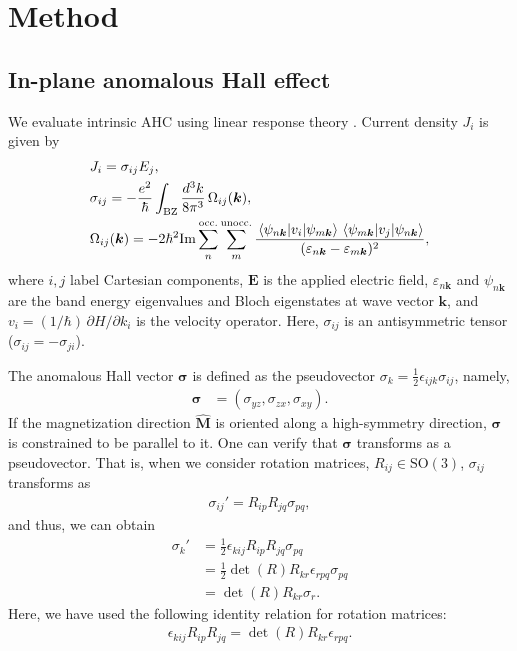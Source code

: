 \documentclass[preprint,12pt]{elsarticle}
\begin{document}
 \section{Method}

\subsection{In-plane anomalous Hall effect}
\label{sec:iahe}

We evaluate intrinsic AHC using linear response theory
\cite{Xiao2010-zr}. Current density $J_i$ is given by
\begin{align}
  & J_i = \sigma_{ij} E_j,
  \\
  & \sigma_{ij} = -\frac{e^2}{\hbar} \int_{\mathrm{BZ}} \frac{d^3 k}{8\pi^3}
  \, \Omega_{ij} (\bm{k}),   \\
  & \Omega_{ij} (\bm{k}) = -2 \hbar^2 \mathrm{Im} \sum_{n}^{\mathrm{occ.}}
  \sum_{m}^{\mathrm{unocc.}}
  \frac{\mel{\psi_{n\bm{k}}}{v_i}{\psi_{m\bm{k}}}
  \mel{\psi_{m\bm{k}}}{v_j}{\psi_{n\bm{k}}}}{(\varepsilon_{n\bm{k}} -
  \varepsilon_{m\bm{k}})^2},
\end{align}
where $i,j$ label Cartesian components, $\bm{E}$ is the applied electric field,
$\varepsilon_{n\bm{k}}$ and $\psi_{n\bm{k}}$ are the band energy
eigenvalues and Bloch eigenstates at wave vector $\bm{k}$, and
$v_i=(1/\hbar)\,\partial H/\partial k_i$ is the velocity operator.
Here, $\sigma_{ij}$ is an antisymmetric tensor
($\sigma_{ij}=-\sigma_{ji}$).

The anomalous Hall vector $\bm{\sigma}$ is defined as the pseudovector
$\sigma_k = \frac{1}{2} \epsilon_{ijk} \sigma_{ij}$, namely,
\begin{align}
  \bm{\sigma} & = (\sigma_{yz}, \sigma_{zx}, \sigma_{xy}).
\end{align}
If the magnetization direction $\bm{\hat{M}}$ is oriented along a
high-symmetry direction, $\bm{\sigma}$ is constrained to be parallel to it.
One can verify that $\bm{\sigma}$ transforms as a pseudovector.
That is, when we consider rotation matrices, $R_{ij} \in \mathrm{SO}(3)$,
$\sigma_{ij}$ transforms as
\begin{align}
  \sigma_{ij}' = R_{ip} R_{jq} \sigma_{pq},
\end{align}
and thus, we can obtain
\begin{align}
  \sigma_k' & = \frac{1}{2} \epsilon_{kij} R_{ip} R_{jq} \sigma_{pq}
  \nonumber  \\
  & = \frac{1}{2} \det(R) R_{kr} \epsilon_{rpq} \sigma_{pq} \nonumber \\
  & = \det(R) R_{kr} \sigma_r.
\end{align}
Here, we have used the following identity relation for rotation matrices:
\begin{align}
  \epsilon_{kij} R_{ip} R_{jq} = \det(R) R_{kr} \epsilon_{rpq}.
\end{align}
\end{document}
